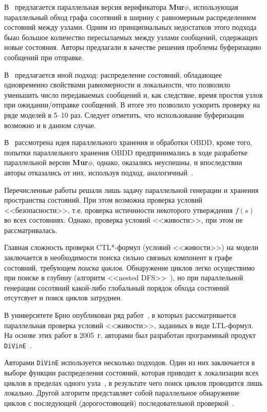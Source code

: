\documentclass[a4paper,notitlepage,14pt]{article}
\begin{document}
В~\cite{Stern97parallelizingthe} предлагается параллельная версия верификатора
\textbf{Mur$\phi$}, использующая параллельный обход графа сосотяний в ширину с равномерным
распределением состояний между узлами. Одним из принципиальных недостатков этого подхода
быао большое количество пересылаемых между узлами сообщений, содержащих новые
состояния. Авторы предлагали в качестве решения проблемы буферизацию сообщений при
отправке.

В~\cite{LS99} предлагается иной подход: распределение состояний, обладающее одновременно
свойствами равномерности и локальности, что позволило уменьшить число передаваемых
сообщений и, как следствие, время простоя узлов при ожидании/отправке сообщений. В итоге
это позволило ускорить проверку на ряде моделей в 5--10 раз. Следует отметить, что
использование буферизации возможно и в данном случае.

В~\cite{McMillan92} рассмотрена идея параллельного хранения и обработки OBDD, кроме того,
попытки параллельного хранения OBDD предпринимались в ходе разработке параллельной версии
\textbf{Mur$\phi$}, однако, оказались неуспешны, и впоследствии авторы отказались от них,
используя подход, аналогичный~\cite{LS99}.

Перечисленные работы решали лишь задачу параллельной генерации и хранения пространства
состояний. При этом возможна проверка условий <<безопасности>>, т.е. проверка истичнности
некоторого утверждения $f(s)$ во всех состояниях. Однако, проверка условий <<живости>>,
при этом не рассматривалась.

Главная сложность проверки CTL*-формул (условий <<живости>>) на модели заключается в
необходимости поиска сильно связных компонент в графе состояний, требующем \emph{поиска
  циклов}. Обнаружение циклов легко осуществимо при поиске в глубину (алгоритм <<nested
DFS>>~\cite{DBLP:conf/spin/FaragoS09}), но при параллельной генерации сосотяний какой-либо
глобальный порядок обхода состояний отсутсвует и поиск циклов затруднен.

В университете Брно опубликован ряд работ~\cite{DLTL1,DLTL2}, в которых рассматривается
параллельная проверка условий <<живости>>, заданных в виде LTL-формул. На основе этих
работ в 2005~г. авторами был разработан программный продукт \texttt{DiVinE}~\cite{DiVinE}.

Авторами \texttt{DiVinE} используется несколько подходов. Один из них заключается в выборе
функции распределения состояний, которая приводит к локализации всех циклов в пределах
одного узла~\cite{DLTL1}, в результате чего поиск циклов проводится лишь локально. Другой
алгоритм представляет собой параллельное обнаружение циклов с последующей (дорогостояющей)
последовательной проверкой~\cite{DLTL2}.
\end{document}
